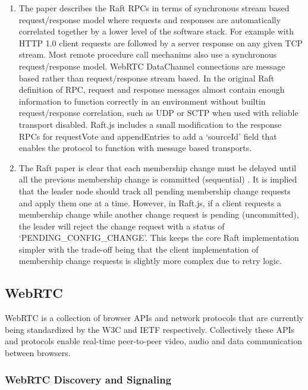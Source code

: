 \documentclass[9pt]{extarticle}
\begin{document}
\begin{multicols}{2}
\begin{enumerate}
\item The paper describes the Raft RPCs in terms of synchronous stream
    based request/response model where requests and responses are
    automatically correlated together by a lower level of the software
    stack. For example with HTTP 1.0 \cite{http:rfc1945} client
    requests are followed by a server response on any given TCP
    stream. Most remote procedure call mechanims also use
    a synchronous request/response model. %
    WebRTC DataChannel connections are message based rather than
    request/response stream based. %
    In the original Raft definition of RPC, request and response messages
    almost contain enough information to function correctly in an
    environment without builtin request/response correlation, such as
    UDP or SCTP when used with reliable transport disabled. %
    Raft.js includes a small modification to the response RPCs for
    requestVote and appendEntries to add a `sourceId' field that
    enables the protocol to function with message based transports.
\item The Raft paper is clear that each membership change must be
    delayed until all the previous membership change is committed
    (sequential) \cite[Section~4.1]{raft_thesis:ongaro14}. It is
    implied that the leader node should track all pending membership
    change requests and apply them one at a time.  However, in
    Raft.js, if a client requests a membership change while another
    change request is pending (uncommitted), the leader will reject
    the change request with a status of `PENDING\_CONFIG\_CHANGE'.
    This keeps the core Raft implementation simpler with the trade-off
    being that the client implementation of membership change requests
    is slightly more complex due to retry logic.
\end{enumerate}

\subsection{WebRTC}

WebRTC is a collection of browser APIs \cite{webrtc:feb2015} and
network protocols \cite{draft-rtcweb-overview} that are currently
being standardized by the W3C and IETF respectively. Collectively these
APIs and protocols enable real-time peer-to-peer video, audio and data
communication between browsers.

\subsubsection{WebRTC Discovery and Signaling}


\end{multicols}
\end{document}
